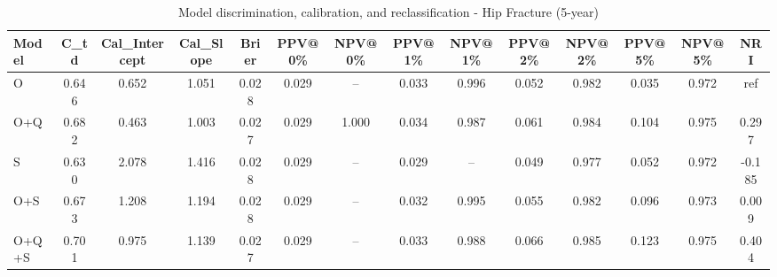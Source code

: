 \begin{table}[htbp]
\centering
\small
\caption{Model discrimination, calibration, and reclassification - Hip Fracture (5-year)}
\label{tab:perf_pd_5y}
\begin{tabular}{lccccccccccccc}
\toprule
Model & C\_td & Cal\_Intercept & Cal\_Slope & Brier & PPV@0\% & NPV@0\% & PPV@1\% & NPV@1\% & PPV@2\% & NPV@2\% & PPV@5\% & NPV@5\% & NRI \\
\midrule
O & 0.646 & 0.652 & 1.051 & 0.028 & 0.029 & -- & 0.033 & 0.996 & 0.052 & 0.982 & 0.035 & 0.972 & ref \\
O+Q & 0.682 & 0.463 & 1.003 & 0.027 & 0.029 & 1.000 & 0.034 & 0.987 & 0.061 & 0.984 & 0.104 & 0.975 & 0.297 \\
S & 0.630 & 2.078 & 1.416 & 0.028 & 0.029 & -- & 0.029 & -- & 0.049 & 0.977 & 0.052 & 0.972 & -0.185 \\
O+S & 0.673 & 1.208 & 1.194 & 0.028 & 0.029 & -- & 0.032 & 0.995 & 0.055 & 0.982 & 0.096 & 0.973 & 0.009 \\
O+Q+S & 0.701 & 0.975 & 1.139 & 0.027 & 0.029 & -- & 0.033 & 0.988 & 0.066 & 0.985 & 0.123 & 0.975 & 0.404 \\
\bottomrule
\end{tabular}
\end{table}
